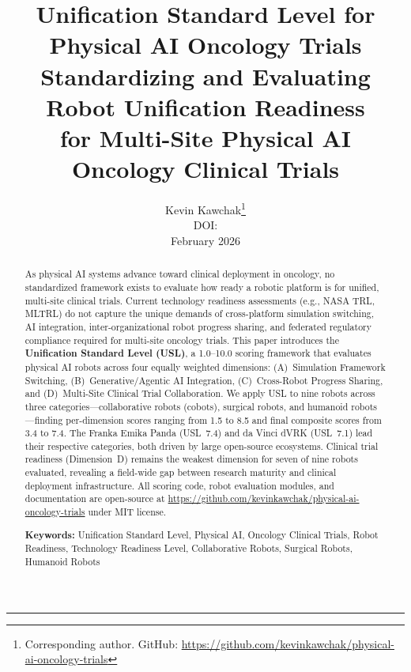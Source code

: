 \documentclass[11pt,a4paper]{article}
\title{%
  \vspace{-1.5cm}
  {\Large\bfseries Unification Standard Level for Physical AI Oncology Trials}\\[0.4em]
  {\large Standardizing and Evaluating Robot Unification Readiness\\for Multi-Site Physical AI Oncology Clinical Trials}
}
\author{%
  Kevin Kawchak\thanks{Corresponding author. GitHub: \url{https://github.com/kevinkawchak/physical-ai-oncology-trials}}\\
  \small DOI: \doi{10.5281/zenodo.18778220}\\[0.2em]
  \small February 2026
}
\date{}
\begin{document}
\maketitle
\thispagestyle{fancy}

\begin{abstract}
\noindent
As physical AI systems advance toward clinical deployment in oncology, no standardized framework exists to evaluate how ready a robotic platform is for unified, multi-site clinical trials. Current technology readiness assessments (e.g., NASA TRL, MLTRL) do not capture the unique demands of cross-platform simulation switching, AI integration, inter-organizational robot progress sharing, and federated regulatory compliance required for multi-site oncology trials. This paper introduces the \textbf{Unification Standard Level (USL)}, a 1.0--10.0 scoring framework that evaluates physical AI robots across four equally weighted dimensions: (A)~Simulation Framework Switching, (B)~Generative/Agentic AI Integration, (C)~Cross-Robot Progress Sharing, and (D)~Multi-Site Clinical Trial Collaboration. We apply USL to nine robots across three categories---collaborative robots (cobots), surgical robots, and humanoid robots---finding per-dimension scores ranging from 1.5 to 8.5 and final composite scores from 3.4 to 7.4. The Franka Emika Panda (USL~7.4) and da Vinci dVRK (USL~7.1) lead their respective categories, both driven by large open-source ecosystems. Clinical trial readiness (Dimension~D) remains the weakest dimension for seven of nine robots evaluated, revealing a field-wide gap between research maturity and clinical deployment infrastructure. All scoring code, robot evaluation modules, and documentation are open-source at \url{https://github.com/kevinkawchak/physical-ai-oncology-trials} under MIT license.

\vspace{0.4em}
\noindent\textbf{Keywords:} Unification Standard Level, Physical AI, Oncology Clinical Trials, Robot Readiness, Technology Readiness Level, Collaborative Robots, Surgical Robots, Humanoid Robots
\end{abstract}

\vspace{0.3em}
\hrule
\vspace{0.3em}

{
\small
\tableofcontents
}
\vspace{0.5em}
\end{document}
